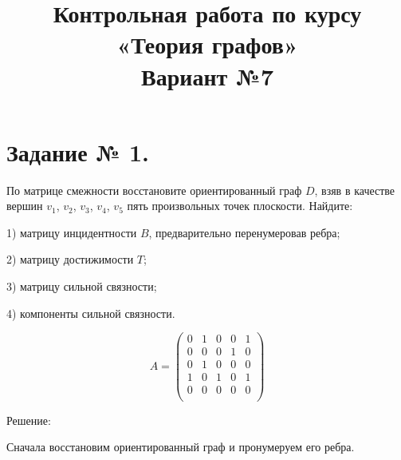 \documentclass[fleqn]{article}
\title{Контрольная работа по курсу «Теория графов»\\
Вариант №7}
\begin{document}
\date{}
\maketitle
\section*{Задание № 1.}

По матрице смежности восстановите ориентированный граф $D$,
взяв в качестве вершин $v_1$, $v_2$, $v_3$, $v_4$, $v_5$ пять произвольных точек плоскости. Найдите:

1) матрицу инцидентности $B$, предварительно перенумеровав ребра;

2) матрицу достижимости $T$;

3) матрицу сильной связности;

4) компоненты сильной связности.

$$A = \begin{pmatrix}
0 & 1 & 0 & 0 & 1 \\
0 & 0 & 0 & 1 & 0 \\
0 & 1 & 0 & 0 & 0 \\
1 & 0 & 1 & 0 & 1 \\
0 & 0 & 0 & 0 & 0 \\
\end{pmatrix}
$$

\begin{center}Решение:\end{center}

Сначала восстановим ориентированный граф и пронумеруем его ребра.

\medskip

\end{document}
